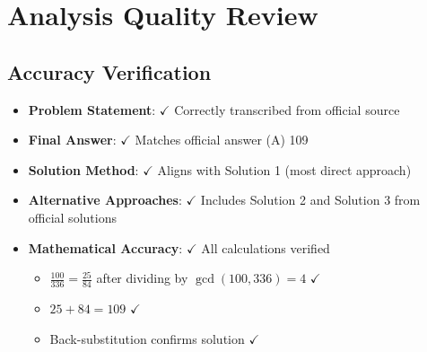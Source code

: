 \documentclass[11pt]{article}
\begin{document}
\section*{Analysis Quality Review}

\subsection*{Accuracy Verification}
\begin{itemize}[leftmargin=*]
    \item \textbf{Problem Statement}: $\checkmark$ Correctly transcribed from official source
    \item \textbf{Final Answer}: $\checkmark$ Matches official answer (A) 109
    \item \textbf{Solution Method}: $\checkmark$ Aligns with Solution 1 (most direct approach)
    \item \textbf{Alternative Approaches}: $\checkmark$ Includes Solution 2 and Solution 3 from official solutions
    \item \textbf{Mathematical Accuracy}: $\checkmark$ All calculations verified
    \begin{itemize}
        \item $\frac{100}{336} = \frac{25}{84}$ after dividing by $\gcd(100,336) = 4$ $\checkmark$
        \item $25 + 84 = 109$ $\checkmark$
        \item Back-substitution confirms solution $\checkmark$
    \end{itemize}
\end{itemize}
\end{document}
